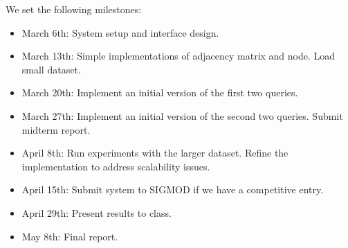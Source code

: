 \documentclass{article}
\begin{document}
\newpage

We set the following milestones:

\begin{itemize}
\item March 6th: System setup and interface design.
\item March 13th: Simple implementations of adjacency matrix and node. Load small dataset.
\item March 20th: Implement an initial version of the first two queries.
\item March 27th: Implement an initial version of the second two queries. Submit midterm report.
\item April 8th: Run experiments with the larger dataset. Refine the implementation to address scalability issues.
\item April 15th: Submit system to SIGMOD if we have a competitive entry.
\item April 29th: Present results to class.
\item May 8th: Final report.
\end{itemize}



\end{document}
